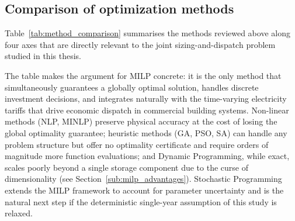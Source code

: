 \documentclass[11pt,a4paper]{report}
\begin{document}
\subsection{Comparison of optimization methods}
\label{sub:method_comparison}

Table~\ref{tab:method_comparison} summarises the methods reviewed above along four axes that are directly relevant to the joint sizing-and-dispatch problem studied in this thesis.

\begin{table}[H]
\centering
\caption{Comparison of energy system optimization methods across key decision criteria.}
\label{tab:method_comparison}
\end{table}

\noindent The table makes the argument for MILP concrete: it is the only method that simultaneously guarantees a globally optimal solution, handles discrete investment decisions, and integrates naturally with the time-varying electricity tariffs that drive economic dispatch in commercial building systems.
Non-linear methods (NLP, MINLP) preserve physical accuracy at the cost of losing the global optimality guarantee; heuristic methods (GA, PSO, SA) can handle any problem structure but offer no optimality certificate and require orders of magnitude more function evaluations; and Dynamic Programming, while exact, scales poorly beyond a single storage component due to the curse of dimensionality (see Section~\ref{sub:milp_advantages}).
Stochastic Programming extends the MILP framework to account for parameter uncertainty and is the natural next step if the deterministic single-year assumption of this study is relaxed.
\end{document}
